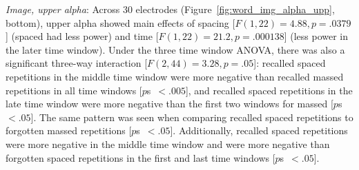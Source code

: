 \textit{Image, upper alpha}: Across 30 electrodes (Figure~\ref{fig:word_img_alpha_upp}, bottom), upper alpha showed main effects of spacing [$F(1,22)=4.88, p=.0379$] (spaced had less power) and time [$F(1,22)=21.2, p=.000138$] (less power in the later time window).  Under the three time window ANOVA, there was also a significant three-way interaction [$F(2,44)=3.28, p=.05$]: recalled spaced repetitions in the middle time window were more negative than recalled massed repetitions in all time windows [$p$s~$<.005$], and recalled spaced repetitions in the late time window were more negative than the first two windows for massed [$p$s~$<.05$].  The same pattern was seen when comparing recalled spaced repetitions to forgotten massed repetitions [$p$s~$<.05$].  Additionally, recalled spaced repetitions were more negative in the middle time window and were more negative than forgotten spaced repetitions in the first and last time windows [$p$s~$<.05$].


